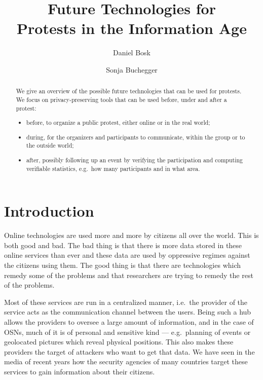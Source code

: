 \documentclass[a4paper]{llncs}
\title{%
  Future Technologies for\\
  Protests in the Information Age
}
\author{%
  Daniel Bosk
  \and
  Sonja Buchegger
}
\institute{%
  School of Computer Science and Communication,\\
  KTH Royal Institute of Technology,
  Stockholm\\
  \email{\{dbosk,buc\}@kth.se}
}
\begin{document}
\maketitle

\begin{abstract}
  We give an overview of the possible future technologies that can be used for 
  protests.
  We focus on privacy-preserving tools that can be used before, under and after 
  a protest:
  \begin{itemize}
    \item before, to organize a public protest, either online or in the real 
      world;
    \item during, for the organizers and participants to communicate, within 
      the group or to the outside world;
    \item after, possibly following up an event by verifying the participation 
      and computing verifiable statistics, e.g.\ how many participants and in 
      what area.
  \end{itemize}
\end{abstract}


\section{Introduction}
\label{Introduction}

Online technologies are used more and more by citizens all over the world.
This is both good and bad.
The bad thing is that there is more data stored in these online services than 
ever and these data are used by oppressive regimes against the citizens using 
them.
The good thing is that there are technologies which remedy some of the problems 
and that researchers are trying to remedy the rest of the problems.

Most of these services are run in a centralized manner, i.e.\ the provider of 
the service acts as the communication channel between the users.
Being such a hub allows the providers to oversee a large amount of information, 
and in the case of \acp{OSN}, much of it is of personal and sensitive kind ---  
e.g.\ planning of events or geolocated pictures which reveal physical 
positions.
This also makes these providers the target of attackers who want to get that 
data.
We have seen in the media of recent years how the security agencies of many 
countries target these services to gain information about their citizens.
\end{document}

